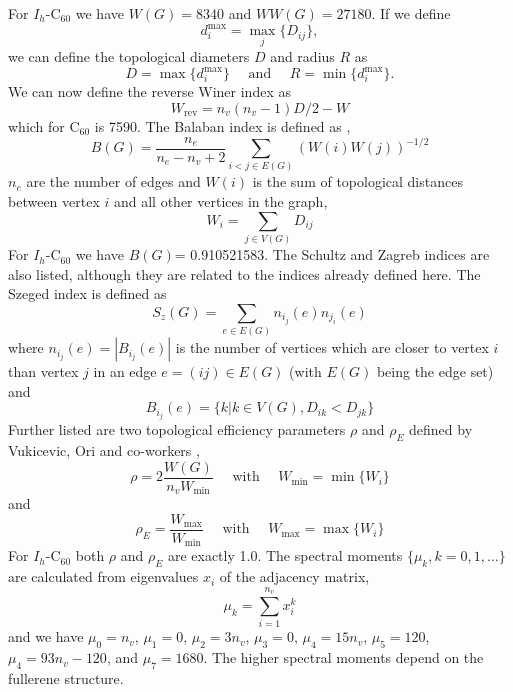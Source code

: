\documentclass[article,a4paper,twoside]{memoir}
\newcommand{\C}[1]{\ensuremath{\mathrm{C}_{#1}}}
\begin{document}
For $I_h$-\C{60} we have $W(G)=8340$ and $WW(G)=27180$. If we define
\begin{equation}
  \label{TopDist}
  d_i^{\mathrm{max}} = \max\limits_{j} \{ D_{ij} \},
\end{equation}
we can define the topological diameters $D$ and radius $R$ as \cite{Caporossi}
\begin{equation}
  \label{TopDist}
  D = \max \{ d_i^\mathrm{max} \} \quad \text{ and } \quad  R = \min \{ d_i^\mathrm{max} \}.
\end{equation}
We can now define the reverse Winer index\cite{Balaban2000} as
\begin{equation}
  \label{RevWiener}
  W_\mathrm{rev} = n_v(n_v - 1)D/2 - W
\end{equation}
which for \C{60} is 7590.  The Balaban index is defined as \cite{Balaban},
\begin{equation}
  \label{Balaban}
  B(G)=\frac{n_e}{n_e-n_v+2} \sum_{i<j \in E(G)} \left( W(i)W(j) \right)^{-1/2}
\end{equation}
$n_e$ are the number of edges and $W(i)$ is the sum of topological distances between vertex $i$ and all other vertices in the graph,
\begin{equation}
  \label{sum}
  W_i=\sum_{j \in V(G)} D_{ij}
\end{equation}
For $I_h$-\C{60} we have $B(G)$= 0.910521583. The Schultz and Zagreb indices are also listed, although they are related to
the indices already defined here. The Szeged index is defined as\cite{Heydari}
\begin{equation}
  \label{Szeged}
  S_z(G)=\sum_{e \in E(G)} n_{i_j}(e)n_{j_i}(e)
\end{equation}
where $n_{i_j}(e) = |B_{i_j}(e)|$ is the number of vertices which are closer to vertex $i$ than vertex $j$ in an edge $e=(ij) \in E(G)$ (with
$E(G)$ being the edge set) and
\begin{equation}
  \label{Szeged1}
  B_{i_j}(e)= \{ k | k \in V(G), D_{ik} < D_{jk} \}
\end{equation}
Further listed are two topological efficiency parameters $\rho$ and $\rho_E$ defined by Vukicevic, Ori and co-workers \cite{Vukicevic,Ori},
\begin{equation}
  \label{rho}
  \rho=2\frac{W(G)}{n_v W_{\mathrm{min}}} \quad \text{ with } \quad W_{\mathrm{min}}= \min \{ W_i \}
\end{equation}
and
\begin{equation}
  \label{rhoE}
  \rho_E=\frac{W_{\mathrm{max}}}{W_{\mathrm{min}}} \quad \text{ with } \quad W_{\mathrm{max}}= \max \{ W_i \}
\end{equation}
For $I_h$-\C{60} both $\rho$ and $\rho_E$ are exactly 1.0. The spectral moments $\{ \mu_k, k=0,1,\dots \} $ are calculated from eigenvalues $x_i$ of the adjacency matrix,
\begin{equation}
  \label{specmom}
  \mu_k=\sum_{i=1}^{n_v} x_i^k
\end{equation}
and we have $\mu_0 = n_v$, $\mu_1 = 0$, $\mu_2 = 3n_v$, $\mu_3 = 0$, $\mu_4 = 15n_v$,
$\mu_5 = 120$, $\mu_4 = 93n_v - 120$, and $\mu_7 = 1680$.  The higher spectral moments
depend on the fullerene structure.\cite{Fowler93}
\end{document}
